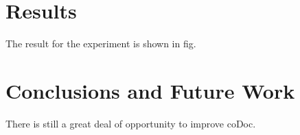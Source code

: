 \documentclass[11pt,letterpaper,oneside]{article}
\begin{document}
\section{Results}
\label{sec:results}
The result for the experiment is shown in fig.


\section{Conclusions and Future Work}
\label{sec:conclusion}
There is still a great deal of opportunity to improve coDoc.





\end{document}
